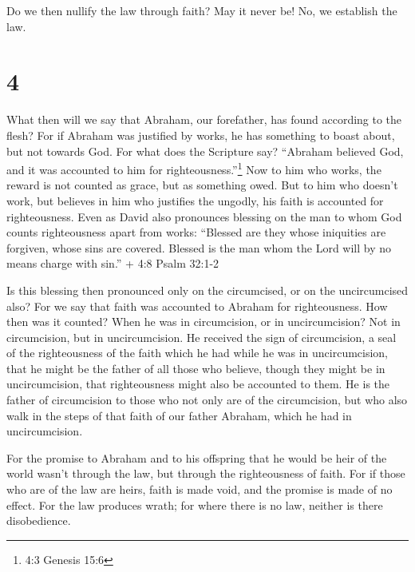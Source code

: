  Do we then nullify the law through faith? May it never be!
No, we establish the law.

\hypertarget{section-3}{%
\section{4}\label{section-3}}

 What then will we say that Abraham, our forefather, has
found according to the flesh?  For if Abraham was justified
by works, he has something to boast about, but not towards God.
 For what does the Scripture say? ``Abraham believed God,
and it was accounted to him for righteousness.''\footnote{4:3 Genesis
  15:6}  Now to him who works, the reward is not counted as
grace, but as something owed.  But to him who doesn't work,
but believes in him who justifies the ungodly, his faith is accounted
for righteousness.  Even as David also pronounces blessing
on the man to whom God counts righteousness apart from works:
 ``Blessed are they whose iniquities are forgiven, whose
sins are covered.  Blessed is the man whom the Lord will by
no means charge with sin.'' + 4:8 Psalm 32:1-2

 Is this blessing then pronounced only on the circumcised,
or on the uncircumcised also? For we say that faith was accounted to
Abraham for righteousness.  How then was it counted? When
he was in circumcision, or in uncircumcision? Not in circumcision, but
in uncircumcision.  He received the sign of circumcision, a
seal of the righteousness of the faith which he had while he was in
uncircumcision, that he might be the father of all those who believe,
though they might be in uncircumcision, that righteousness might also be
accounted to them.  He is the father of circumcision to
those who not only are of the circumcision, but who also walk in the
steps of that faith of our father Abraham, which he had in
uncircumcision.

 For the promise to Abraham and to his offspring that he
would be heir of the world wasn't through the law, but through the
righteousness of faith.  For if those who are of the law
are heirs, faith is made void, and the promise is made of no effect.
 For the law produces wrath; for where there is no law,
neither is there disobedience.

